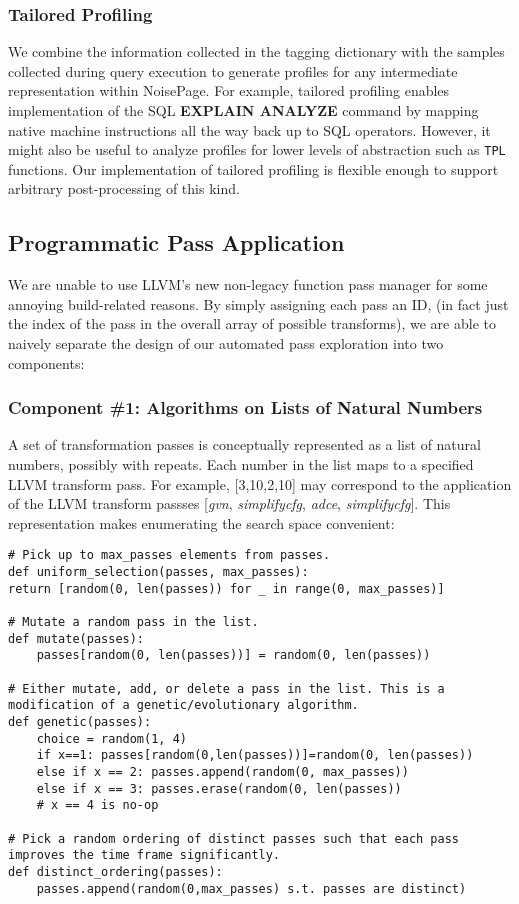 \documentclass{vldb}
\newcommand{\tpl}{\texttt{TPL}\xspace}
\newcommand{\dbCode}[1]{{\sffamily\small \textbf{#1}}\xspace}
\begin{document}
\subsubsection{Tailored Profiling}

We combine the information collected in the tagging dictionary with the samples collected during query execution to generate profiles for any intermediate representation within NoisePage. For example, tailored profiling enables implementation of the SQL \dbCode{EXPLAIN ANALYZE} command by mapping native machine instructions all the way back up to SQL operators. However, it might also be useful to analyze profiles for lower levels of abstraction such as \tpl functions. Our implementation of tailored profiling is flexible enough to support arbitrary post-processing of this kind.

\subsection{Programmatic Pass Application}

We are unable to use LLVM's new non-legacy function pass manager for some annoying build-related reasons. By simply assigning each pass an ID, (in fact just the index of the pass in the overall array of possible transforms), we are able to naively separate the design of our automated pass exploration into two components:

\subsubsection{Component \#1: Algorithms on Lists of Natural Numbers}

A set of transformation passes is conceptually represented as a list of natural numbers, possibly with repeats. Each number in the list maps to a specified LLVM transform pass. For example, [3,10,2,10] may correspond to the application of the LLVM transform passses [\textit{gvn}, \textit{simplifycfg}, \textit{adce}, \textit{simplifycfg}]. This representation makes enumerating the search space convenient:

\begin{lstlisting}
# Pick up to max_passes elements from passes.
def uniform_selection(passes, max_passes):
return [random(0, len(passes)) for _ in range(0, max_passes)]

# Mutate a random pass in the list.
def mutate(passes):
    passes[random(0, len(passes))] = random(0, len(passes))

# Either mutate, add, or delete a pass in the list. This is a modification of a genetic/evolutionary algorithm.
def genetic(passes):
    choice = random(1, 4)
    if x==1: passes[random(0,len(passes))]=random(0, len(passes))
    else if x == 2: passes.append(random(0, max_passes))
    else if x == 3: passes.erase(random(0, len(passes))
    # x == 4 is no-op
    
# Pick a random ordering of distinct passes such that each pass improves the time frame significantly.
def distinct_ordering(passes):
    passes.append(random(0,max_passes) s.t. passes are distinct)
\end{lstlisting}
\end{document}
